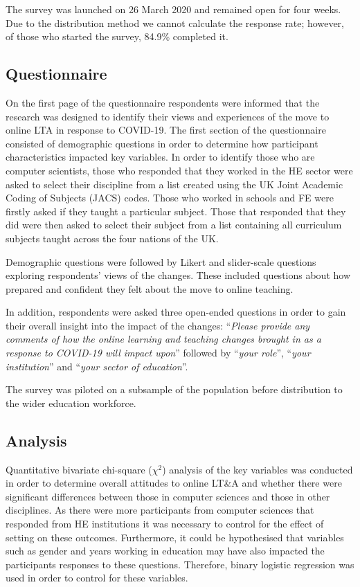\documentclass[sigconf]{acmart}
\begin{document}
The survey was launched on 26 March 2020 and remained open for four
weeks. Due to the distribution method we cannot calculate the response
rate; however, of those who started the survey, 84.9\% completed it.

\subsection{Questionnaire}

On the first page of the questionnaire respondents were informed that
the research was designed to identify their views and experiences of
the move to online LTA in response to COVID-19. The first section of
the questionnaire consisted of demographic questions in order to
determine how participant characteristics impacted key variables. In
order to identify those who are computer scientists, those who
responded that they worked in the HE sector were asked to select their
discipline from a list created using the UK Joint Academic Coding of
Subjects (JACS) codes. Those who worked in schools and FE were firstly
asked if they taught a particular subject. Those that responded that
they did were then asked to select their subject from a list
containing all curriculum subjects taught across the four nations of
the UK.

Demographic questions were followed by Likert and slider-scale
questions exploring respondents' views of the changes. These included
questions about how prepared and confident they felt about the move to
online teaching.

In addition, respondents were asked three open-ended questions in
order to gain their overall insight into the impact of the changes:
``{\emph{Please provide any comments of how the online learning and
teaching changes brought in as a response to COVID-19 will impact
upon}}'' followed by ``{\emph{your role}}'', ``{\emph{your
institution}}'' and ``{\emph{your sector of education}}''.

The survey was piloted on a subsample of the population before
distribution to the wider education workforce.

\subsection{Analysis}

Quantitative bivariate chi-square ($\chi^2$) analysis of the key variables
was conducted in order to determine overall attitudes to online LT\&A
and whether there were significant differences between those in
computer sciences and those in other disciplines.  As there were more
participants from computer sciences that responded from HE
institutions it was necessary to control for the effect of setting on
these outcomes. Furthermore, it could be hypothesised that variables
such as gender and years working in education may have also impacted
the participants responses to these questions. Therefore, binary
logistic regression was used in order to control for these variables.
\end{document}
